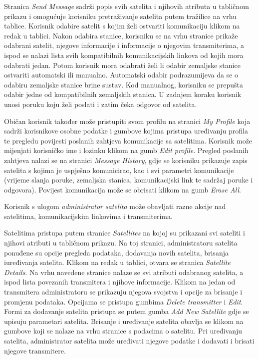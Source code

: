 {{        {   Stranica \textit{Send Message} sadrži popis svih satelita i njihovih atributa u tabličnom prikazu i omogućuje korisniku pretraživanje satelita putem tražilice na vrhu tablice. Korisnik odabire satelit s kojim želi ostvariti komunikaciju klikom na redak u tablici. Nakon odabira stanice, korisniku se na vrhu stranice prikaže odabrani satelit, njegove informacije i informacije o njegovim transmiterima, a ispod se nalazi lista svih kompatibilnih komunikacijskih linkova od kojih mora odabrati jedan. Potom korisnik mora odabrati želi li odabir zemaljske stanice ostvariti automatski ili manualno. Automatski odabir podrazumijeva da se o odabiru zemaljske stanice brine sustav. Kod manualnog, korisniku se prepušta odabir jedne od kompatibilnih zemaljskih stanica. U zadnjem koraku korisnik unosi poruku koju želi poslati i zatim čeka odgovor od satelita.} \par
        
        {Običan korisnik također može pristupiti svom profilu na stranici \textit{My Profile} koja sadrži korisnikove osobne podatke i gumbove kojima pristupa uređivanju profila te pregledu povijesti poslanih zahtjeva komunikacije sa satelitima. Korisnik može mijenjati korisničko ime i lozinku klikom na gumb \textit{Edit profile}. Pregled poslanih zahtjeva nalazi se na stranici \textit{Message History}, gdje se korisniku prikazuje zapis satelita s kojima je uspješno komunicirao, kao i svi parametri komunikacije (vrijeme slanja poruke, zemaljska stanica, komunikacijski link te sadržaj poruke i odgovora). Povijest komunikacija može se obrisati klikom na gumb \textit{Erase All}.} \par

        
        {Korisnik s ulogom \textit{administrator satelita} može obavljati razne akcije nad satelitima, komunikacijskim linkovima i transmiterima.} \par
        {Satelitima pristupa putem stranice \textit{Satellites} na kojoj su prikazani svi sateliti i njihovi atributi u tabličnom prikazu. Na toj stranici, administratoru satelita ponuđene su opcije pregleda podataka, dodavanja novih satelita, brisanja i\newline uređivanja satelita. Klikom na redak u tablici, otvara se stranica \textit{Satellite Details}. Na vrhu navedene stranice nalaze se svi atributi odabranog satelita, a ispod lista povezanih transmitera i njihove informacije. Klikom na jedan od transmitera administratoru se prikazuju njegova svojstva i opcije za brisanje i promjenu podataka. Opcijama se pristupa gumbima \textit{Delete transmitter} i \textit{Edit}.
        Formi za dodavanje satelita pristupa se putem gumba \textit{Add New Satellite} gdje se upisuju parametari satelita.
        Brisanje i uređivanje satelita obavlja se klikom na gumbove koji se nalaze na vrhu stranice s podacima o satelitu. Pri uređivanju satelita, administrator satelita može uređivati njegove podatke i dodavati i brisati njegove transmitere.}\par

}}
